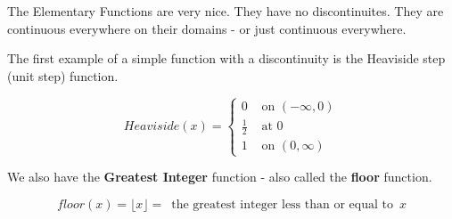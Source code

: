 \documentclass{ximera}
\begin{document}
The Elementary Functions are very nice.  They have no discontinuites.  They are continuous everywhere on their domains - or just continuous everywhere.





The first example of a simple function with a discontinuity is the Heaviside step (unit step) function.






\[
Heaviside(x) = 
\begin{cases}
  0 & \text{ on } (-\infty, 0) \\
  \tfrac{1}{2} & \text{ at } 0 \\
  1 & \text{ on } (0, \infty) 
\end{cases}
\]






We also have the \textbf{Greatest Integer} function - also called the \textbf{floor} function.


\[
floor(x) = \lfloor x \rfloor = \, \text{ the greatest integer less than or equal to } \, x
\]
\end{document}
